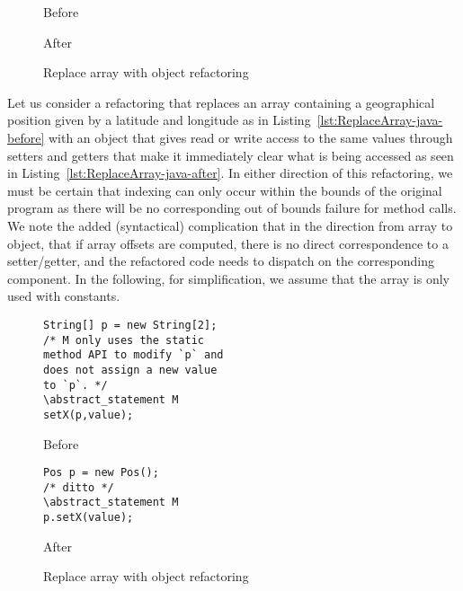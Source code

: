 \begin{figure}[tbp]
  \captionsetup{type=lstlisting}
  \centering
  \begin{sublstlisting}[h]{.45\linewidth} 
    
    \caption{Before}
    \label{lst:ReplaceArray-java-before}
  \end{sublstlisting}\hspace{1cm}
  \begin{sublstlisting}[h]{.45\linewidth}
    
    \caption{After}
    \label{lst:ReplaceArray-java-after}
  \end{sublstlisting}
  \caption{Replace array with object refactoring}
  \label{refa:ReplaceArray-java}
\end{figure}

Let us consider a refactoring that replaces an array containing a geographical position given by a latitude and longitude as in Listing~\ref{lst:ReplaceArray-java-before} with an object that gives read or write access to the same values through setters and getters that make it immediately clear what is being accessed as seen in Listing~\ref{lst:ReplaceArray-java-after}.
In either direction of this refactoring, we must be certain that indexing can only occur within the bounds of the original program as there will be no corresponding out of bounds failure for method calls.
We note the added (syntactical) complication that in the direction from array to object, that if array offsets are computed, there is no direct correspondence to a setter/getter,
and the refactored code needs to dispatch on the corresponding component.
In the following, for simplification, we assume that the array is only used with constants.



\begin{figure}[tbp]
\captionsetup{type=lstlisting}
\begin{sublstlisting}[b]{.45\linewidth} 
\begin{lstlisting}[style=smallJava]
String[] p = new String[2];
/* M only uses the static
method API to modify `p` and
does not assign a new value
to `p`. */
\abstract_statement M
setX(p,value);
\end{lstlisting}
\caption{Before}
\label{lst:ArrayBefore}
\end{sublstlisting}\hspace{1cm}
\begin{sublstlisting}[b]{.45\linewidth}
\begin{lstlisting}[style=smallJava]
Pos p = new Pos();
/* ditto */
\abstract_statement M
p.setX(value);
\end{lstlisting}
\caption{After}
\label{lst:ArrayAfter}
\end{sublstlisting}
\caption{Replace array with object refactoring}
\label{lst:ReplaceArray-REF}
\end{figure}

